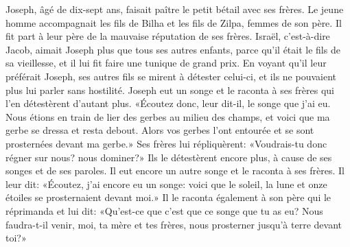 Joseph, âgé de dix-sept ans, faisait paître le petit bétail avec ses frères.
Le jeune homme accompagnait les fils de Bilha et les fils de Zilpa,
	femmes de son père.
	Il fit part à leur père de la mauvaise réputation de ses frères.
Israël, c’est-à-dire Jacob, aimait Joseph plus que tous ses autres enfants,
	parce qu’il était le fils de sa vieillesse,
	et il lui fit faire une tunique de grand prix.
En voyant qu’il leur préférait Joseph,
	ses autres fils se mirent à détester celui-ci,
	et ils ne pouvaient plus lui parler sans hostilité.
Joseph eut un songe et le raconta à ses frères
	qui l’en détestèrent d’autant plus.
«Écoutez donc, leur dit-il, le songe que j’ai eu.
Nous étions en train de lier des gerbes au milieu des champs,
	et voici que ma gerbe se dressa et resta debout.
Alors vos gerbes l’ont entourée et se sont prosternées devant ma gerbe.»
Ses frères lui répliquèrent:
	«Voudrais-tu donc régner sur nous? nous dominer?»
Ils le détestèrent encore plus, à cause de ses songes et de ses paroles.
Il eut encore un autre songe et le raconta à ses frères.
Il leur dit: «Écoutez, j’ai encore eu un songe:
	voici que le soleil, la lune et onze étoiles se prosternaient devant moi.»
Il le raconta également à son père qui le réprimanda et lui dit:
	«Qu’est-ce que c’est que ce songe que tu as eu?
	Nous faudra-t-il venir, moi, ta mère et tes frères,
	nous prosterner jusqu’à terre devant toi?»
